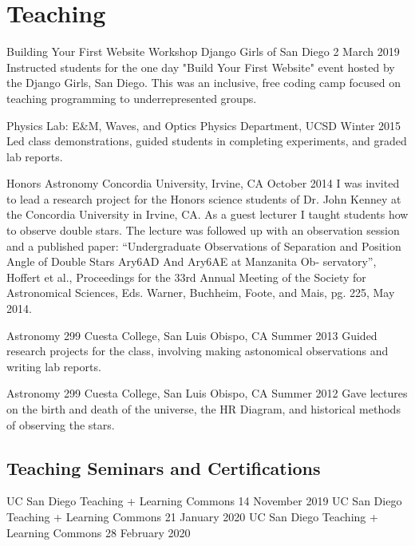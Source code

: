 \section{Teaching}

    {Building Your First Website Workshop}
    {Django Girls of San Diego}
    {2 March 2019}
Instructed students for the one day "Build Your First Website" event hosted by the Django Girls, San Diego.
This was an inclusive, free coding camp focused on teaching programming to underrepresented groups.

    {Physics Lab: E\&M, Waves, and Optics}
    {Physics Department, UCSD}
    {Winter 2015} 
Led class demonstrations, guided students in completing experiments, and graded lab reports.

    {Honors Astronomy}
    {Concordia University, Irvine, CA}
    {October 2014}
I was invited to lead a research project for the Honors science students of Dr. John Kenney at the Concordia University in Irvine, CA. As a guest lecturer I taught students how to observe double stars. The lecture was followed up with an observation session and a published paper:
``Undergraduate Observations of Separation and Position Angle of Double Stars Ary6AD And Ary6AE at Manzanita Ob- servatory'', Hoffert et al., Proceedings for the 33rd Annual Meeting of the Society for Astronomical Sciences, Eds. Warner, Buchheim, Foote, and Mais, pg. 225, May 2014.

    {Astronomy 299}
    {Cuesta College, San Luis Obispo, CA}
    {Summer 2013}
Guided research projects for the class, involving making astonomical observations and writing lab reports.

    {Astronomy 299}
    {Cuesta College, San Luis Obispo, CA}
    {Summer 2012}
Gave lectures on the birth and death of the universe, the HR Diagram, and historical methods of observing the stars.

\subsection{Teaching Seminars and Certifications}
    {UC San Diego Teaching + Learning Commons}
    {14 November 2019}
    {UC San Diego Teaching + Learning Commons}
    {21 January 2020}
    {UC San Diego Teaching + Learning Commons}
    {28 February 2020}
